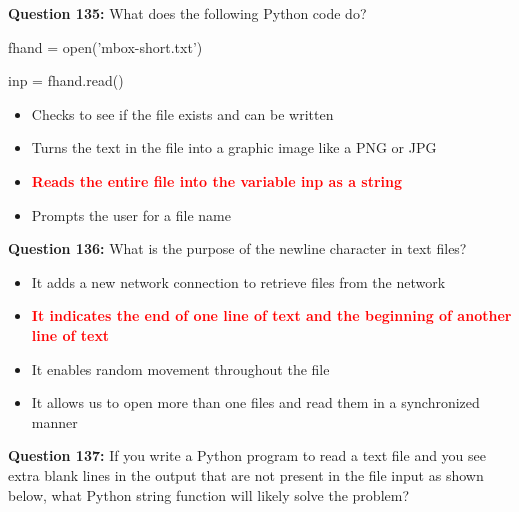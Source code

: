 \documentclass[12pt,a4paper]{article}
\begin{document}
\vspace{0.5cm}

\textbf{Question 135:} What does the following Python code do?\newline

\newline
\newline

\newline
fhand = open('mbox-short.txt')\newline

\newline
inp = fhand.read()

\begin{itemize}
    \item[\textbf{A.}] Checks to see if the file exists and can be written
    \item[\textbf{B.}] Turns the text in the file into a graphic image like a PNG or JPG
    \item[\textbf{C.}] \textcolor{red}{\textbf{Reads the entire file into the variable inp as a string}}
    \item[\textbf{D.}] Prompts the user for a file name
\end{itemize}

\vspace{0.5cm}

\textbf{Question 136:} What is the purpose of the newline character in text files?

\begin{itemize}
    \item[\textbf{A.}] It adds a new network connection to retrieve files from the network
    \item[\textbf{B.}] \textcolor{red}{\textbf{It indicates the end of one line of text and the beginning of another line of text}}
    \item[\textbf{C.}] It enables random movement throughout the file
    \item[\textbf{D.}] It allows us to open more than one files and read them in a synchronized manner
\end{itemize}

\vspace{0.5cm}

\textbf{Question 137:} If you write a Python program to read a text file and you see extra blank lines in the output that are not present in the file input as shown below, what Python string function will likely solve the problem?\newline
\end{document}
